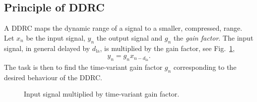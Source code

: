 \documentclass[../main2.tex]{subfiles}
\providecommand{\rootdir}{..}
\begin{document}
\subsection{Principle of DDRC}
A DDRC maps the dynamic range of a signal to a smaller, compressed, range. Let $x_n$ be the input signal, $y_n$ the output signal and $g_n$ the \emph{gain factor}. The input signal, in general delayed by $d_\text{la}$, is multiplied by the gain factor, see Fig.~\ref{fig:block_gain},
\begin{align}
y_n = g_nx_{n-d_\text{la}}.
\label{eq:gainfactor}
\end{align}
The task is then to find the time-variant gain factor $g_n$ corresponding to the desired behaviour of the DDRC. 
\begin{figure}[h]
\centerline{}
\caption{Input signal multiplied by time-variant gain factor.}
\label{fig:block_gain}
\end{figure}
\end{document}
